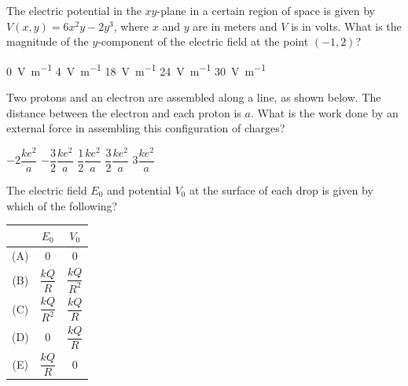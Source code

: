 \documentclass[12pt]{../../../oss-classkick-exam}
\begin{document}
\begin{questions}
  \question The electric potential in the $xy$-plane in a certain region of
  space is given by $V(x,y)=6x^2y-2y^3$, where $x$ and $y$ are in meters and
  $V$ is in volts. What is the magnitude of the $y$-component of the electric
  field at the point $(-1,2)$?
  \begin{choices}
    \choice\SI{0}{\volt\per\metre}
    \choice\SI{4}{\volt\per\metre}
    \choice\SI{18}{\volt\per\metre}
    \choice\SI{24}{\volt\per\metre}
    \choice\SI{30}{\volt\per\metre}
  \end{choices}

  \uplevel{ \rule{\linewidth}{.5pt}}
  

  \question Two protons and an electron are assembled along a line, as shown
  below. The distance between the electron and each proton is $a$. What is the
  work done by an external force in assembling this configuration of charges?
  \begin{choices}
    \choice $-2\dfrac{ke^2}a$
    \choice $-\dfrac32\dfrac{ke^2}a$
    \choice $\dfrac12\dfrac{ke^2}a$
    \choice $\dfrac32\dfrac{ke^2}a$
    \choice $3\dfrac{ke^2}a$
  \end{choices}


  \question The electric field $E_0$ and potential $V_0$ at the surface of each
  drop is given by which of the following?
  \label{rain1}
  
  \begin{tabular}{ccc}
    & $E_0$ & $V_0$ \\ \hline
    (A) & 0 & 0 \\
    (B) & $\dfrac{kQ}R$ & $\dfrac{kQ}{R^2}$ \\
    (C) & $\dfrac{kQ}{R^2}$ & $\dfrac{kQ}R$ \\
    (D) & 0 & $\dfrac{kQ}R$ \\
    (E) & $\dfrac{kQ}R$ & 0
  \end{tabular}


\end{questions}
\end{document}
